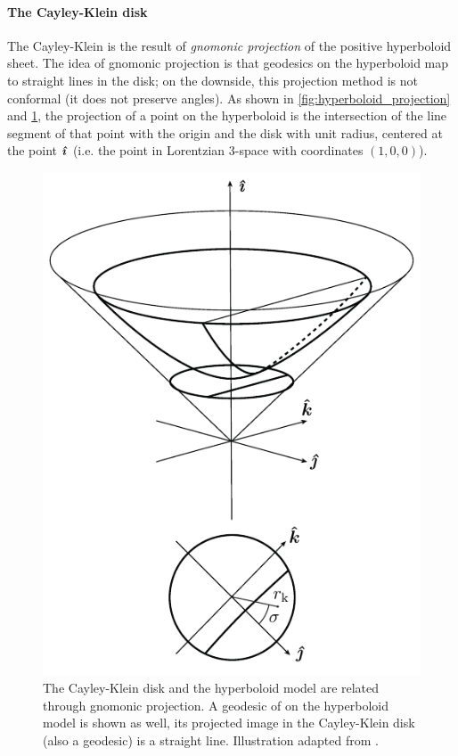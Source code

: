 \paragraph{The Cayley-Klein disk} The Cayley-Klein is the result of \emph{gnomonic projection} of the positive hyperboloid sheet. The idea of gnomonic projection is that geodesics on the hyperboloid map to straight lines in the disk; on the downside, this projection method is not conformal (it does not preserve angles). As shown in \cref{fig:hyperboloid_projection} and \cref{fig:cayley_disk}, the projection of a point on the hyperboloid is the intersection of the line segment of that point with the origin and the disk with unit radius, centered at the point \(\quati\) (i.e. the point in Lorentzian 3-space with coordinates \((1, 0, 0)\)). 
\begin{figure}[ht!]
    \centering
    \includegraphics[scale=1]{media/other/cayley_disk-eps-converted-to}
    \caption{The Cayley-Klein disk and the hyperboloid model are related through gnomonic projection. A geodesic of on the hyperboloid model is shown as well, its projected image in the Cayley-Klein disk (also a geodesic) is a straight line. Illustration adapted from \citet{Balazs1986}.}
    \label{fig:cayley_disk}
\end{figure}

